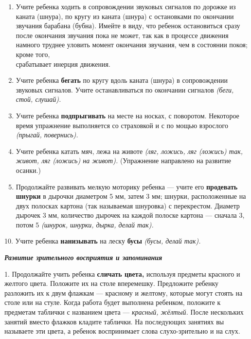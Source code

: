 \documentclass[a5paper]{book}
\renewcommand{\emph}[1]{\textit{#1}}
\begin{document}
\begin{enumerate}
\def\labelenumi{\arabic{enumi}.}
\setcounter{enumi}{4}
\item
  
  Учите ребенка ходить в сопровождении звуковых сигналов по дорожке из
  каната (шнура), по кругу из каната (шнура) с остановками по окончании
  звучания барабана (бубна). Имейте в виду, что ребенок остановиться
  сразу после окончания звучания пока не может, так как в процессе
  движения намного труднее уловить момент окончания звучания, чем в
  состоянии покоя; кроме того,\\
  срабатывает инерция движения.
  
\item
  
  Учите ребенка \textbf{бегать} по кругу вдоль каната (шнура) в
  сопровождении звуковых сигналов. Учите останавливаться по окончании
  сигналов \emph{(беги, стой, слушай).}
  
\item
  
  Учите ребенка \textbf{подпрыгивать} на месте на носках, с поворотом.
  Некоторое время упражнение выполняется со страховкой и с по мощью
  взрослого \emph{(прыгай, повернись).}
  
\item
  
  Учите ребенка катать мяч, лежа на животе \emph{(ляг, ложись, ляг
  (ложись) так, живот, ляг (ложись) на живот).} (Упражнение направлено
  на развитие осанки.)
  
\item
  
  Продолжайте развивать мелкую моторику ребенка --- учите его
  \textbf{продевать шнурки} в дырочки диаметром 5 мм, затем 3 мм;
  шнурки, расположенные на двух полосках картона (так называемая
  шнуровка) с перекрестом. Диаметр дырочек 3 мм, количество дырочек на
  каждой полоске картона --- сначала 3, потом 5 \emph{(шнурок, шнурки,
  дырка, делай так).}
  
\end{enumerate}


10. Учите ребенка \textbf{нанизывать} на леску \textbf{бусы}
\emph{(бусы, делай так).}

\emph{\textbf{Развитие зрительного восприятия и запоминания}}

1. Продолжайте учить ребенка \textbf{сличать цвета,} используя предметы
красного и желтого цвета. Положите их на столе вперемешку. Предложите
ребенку разложить их к двум флажкам --- красному и желтому, которые
могут стоять на столе или на стуле. Когда работа будет выполнена
ребенком, положите к предметам таблички с названием цвета ---
\emph{красный, жёлтый.} После нескольких занятий вместо флажков кладите
таблички. На последующих занятиях вы называете эти цвета, а ребенок
воспринимает слова слухо-зрительно и на слух.
\end{document}
